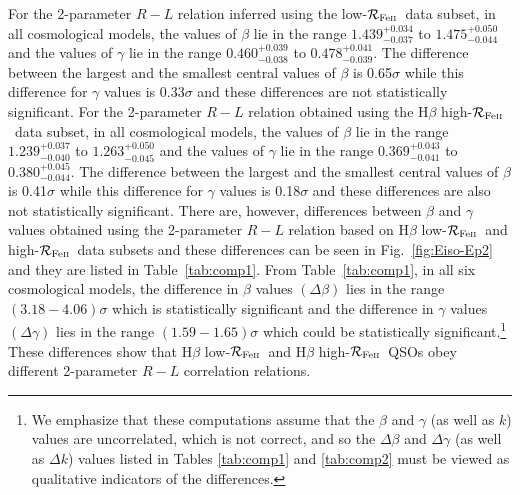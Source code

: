 \documentclass[a4paper,fleqn,usenatbib]{mnras}
\newcommand{\rfe}{${\cal R}_{\rm{Fe\textsc{ii}}}$}
\begin{document}
For the 2-parameter $R-L$ relation inferred using the low-\rfe\ data subset, in all cosmological models, the values of $\beta$ lie in the range $1.439^{+0.034}_{-0.037}$ to $1.475^{+0.050}_{-0.044}$ and the values of $\gamma$ lie in the range $0.460^{+0.039}_{-0.038}$ to $0.478^{+0.041}_{-0.039}$. The difference between the largest and the smallest central values of $\beta$ is 0.65$\sigma$ while this difference for $\gamma$ values is 0.33$\sigma$ and these differences are not statistically significant. For the 2-parameter $R-L$ relation obtained using the H$\beta$ high-\rfe\ data subset, in all cosmological models, the values of $\beta$ lie in the range $1.239^{+0.037}_{-0.040}$ to $1.263^{+0.050}_{-0.045}$ and the values of $\gamma$ lie in the range $0.369^{+0.043}_{-0.041}$ to $0.380^{+0.045}_{-0.044}$. The difference between the largest and the smallest central values of $\beta$ is 0.41$\sigma$ while this difference for $\gamma$ values is 0.18$\sigma$ and these differences are also not statistically significant. There are, however, differences between $\beta$ and $\gamma$ values obtained using the 2-parameter $R-L$ relation based on H$\beta$ low-\rfe\ and high-\rfe\ data subsets and these differences can be seen in Fig.\ \ref{fig:Eiso-Ep2} and they are listed in Table~\ref{tab:comp1}. From Table~\ref{tab:comp1}, in all six cosmological models, the difference in $\beta$ values $(\Delta \beta)$ lies in the range $(3.18-4.06)\sigma$ which is statistically significant and the difference in $\gamma$ values $(\Delta \gamma)$ lies in the range $(1.59-1.65)\sigma$ which could be statistically significant.\footnote{We emphasize that these computations assume that the $\beta$ and $\gamma$ (as well as $k$) values are uncorrelated, which is not correct, and so the $\Delta \beta$ and $\Delta \gamma$ (as well as $\Delta k$) values listed in Tables \ref{tab:comp1} and \ref{tab:comp2} must be viewed as qualitative indicators of the differences.} These differences show that H$\beta$ low-\rfe\ and H$\beta$ high-\rfe\ QSOs obey different 2-parameter $R-L$ correlation relations.
\end{document}
